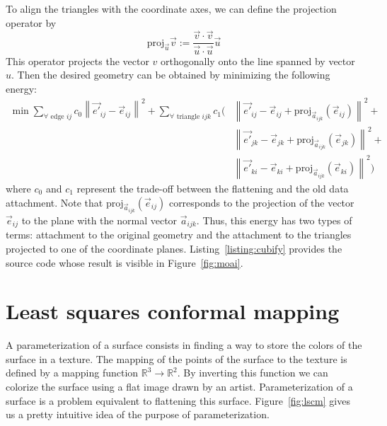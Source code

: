 \documentclass[notitlepage,oneside]{book}
\begin{document}
To align the triangles with the coordinate axes, we can define the projection operator by
$$
\text{proj}_{\vec{u}} \vec{v} := \frac{\vec{v}\cdot\vec{v}}{\vec{u}\cdot\vec{u}}\vec{u}
$$
This operator projects the vector $v$ orthogonally onto the line spanned by vector $u$.
Then the desired geometry can be obtained by minimizing the following energy:
\begin{align*}
\min \sum\limits_{\forall \text{~edge~} ij}c_0\left\|\vec{e'}_{ij} - \vec{e}_{ij}\right\|^2 +
\sum\limits_{\forall \text{~triangle~} ijk}c_1\biggl(& \left\|\vec{e'}_{ij} - \vec{e}_{ij} + \text{proj}_{\vec{a}_{ijk}} \left( \vec{e}_{ij}\right) \right\|^2 +\\
&\left\|\vec{e'}_{jk} - \vec{e}_{jk} + \text{proj}_{\vec{a}_{ijk}} \left( \vec{e}_{jk}\right) \right\|^2 +\\
&\left\|\vec{e'}_{ki} - \vec{e}_{ki} + \text{proj}_{\vec{a}_{ijk}} \left( \vec{e}_{ki}\right) \right\|^2\biggr)
\end{align*}
where $c_0$ and $c_1$ represent the trade-off between the flattening and the old data attachment.
Note that $\text{proj}_{\vec{a}_{ijk}} \left( \vec{e}_{ij}\right)$ corresponds to the projection of the vector $\vec{e}_{ij}$ to the plane with the normal vector $\vec{a}_{ijk}$.
Thus, this energy has two types of terms: attachment to the original geometry and the attachment to the triangles projected to one of the coordinate planes.
Listing~\ref{listing:cubify} provides the source code whose result is visible in Figure~\ref{fig:moai}.

\newpage
\section{Least squares conformal mapping}
\label{sec:lscm}
A parameterization of a surface consists in finding a way to store the colors of the surface in a texture.
The mapping of the points of the surface to the texture is defined by a mapping function $\mathbb R^3 \rightarrow \mathbb R^2$.
By inverting this function we can colorize the surface using a flat image drawn by an artist.
Parameterization of a surface is a problem equivalent to flattening this surface.
Figure~\ref{fig:lscm} gives us a pretty intuitive idea of the purpose of parameterization.
\end{document}
